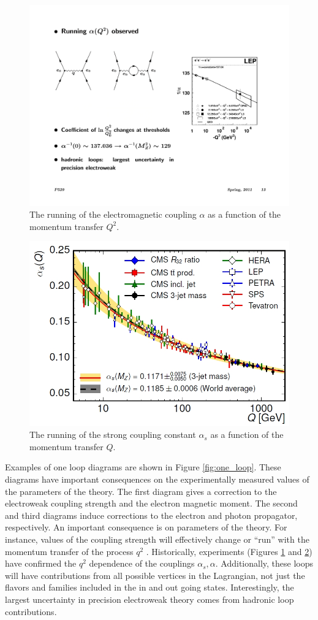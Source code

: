 \begin{figure}
\begin{center}
\includegraphics[width=.54\textwidth]{pics/alpha_qed}
\end{center}
\caption{The running of the electromagnetic coupling $\alpha$ as a function of the momentum transfer $Q^2$.}
\label{fig:running_coupling_qed}
\end{figure}

\begin{figure}
\begin{center}
\includegraphics[width=.65\textwidth]{pics/alpha_s}
\end{center}
\caption{The running of the strong coupling constant $\alpha_s$ as a function of the momentum transfer $Q$.}
\label{fig:running_coupling_s}
\end{figure}


Examples of one loop diagrams are shown in Figure \ref{fig:one_loop}. These diagrams have important consequences on the
experimentally measured values of the parameters of the theory. The first diagram gives a correction to the electroweak coupling
strength and the electron magnetic moment. The second and third diagrams induce corrections to the electron and photon propagator,
respectively. An important consequence is on parameters of the theory. For instance, values of the coupling strength 
will effectively change or ``run'' with
the momentum transfer of the process $q^2$ . Historically, experiments
(Figures \ref{fig:running_coupling_qed} and \ref{fig:running_coupling_s}) have confirmed the $q^2$ dependence of the
 couplings $\alpha_s, \alpha$. Additionally, these loops will have contributions from all 
possible vertices in the Lagrangian, not just the flavors and families included in the in and 
out going states. Interestingly, the largest uncertainty in precision electroweak theory comes from hadronic loop contributions.

